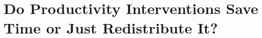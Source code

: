\chapter{Do Productivity Interventions Save Time or Just Redistribute It?}
\label{ch:conservation}

















%
